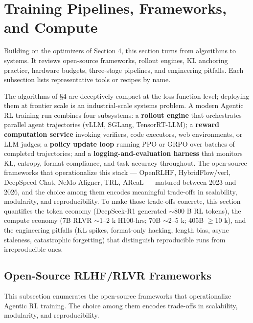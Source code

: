 \documentclass{article}
\begin{document}
\section{Training Pipelines, Frameworks, and Compute}\label{training-pipelines-frameworks-and-compute}

Building on the optimizers of Section 4, this section turns from algorithms to systems. It reviews open-source frameworks, rollout engines, KL anchoring practice, hardware budgets, three-stage pipelines, and engineering pitfalls. Each subsection lists representative tools or recipes by name.

The algorithms of §4 are deceptively compact at the loss-function level; deploying them at frontier scale is an industrial-scale systems problem. A modern Agentic RL training run combines four subsystems: a \textbf{rollout engine} that orchestrates parallel agent trajectories (vLLM, SGLang, TensorRT-LLM); a \textbf{reward computation service} invoking verifiers, code executors, web environments, or LLM judges; a \textbf{policy update loop} running PPO or GRPO over batches of completed trajectories; and a \textbf{logging-and-evaluation harness} that monitors KL, entropy, format compliance, and task accuracy throughout. The open-source frameworks that operationalize this stack --- OpenRLHF, HybridFlow/verl, DeepSpeed-Chat, NeMo-Aligner, TRL, AReaL --- matured between 2023 and 2026, and the choice among them encodes meaningful trade-offs in scalability, modularity, and reproducibility. To make those trade-offs concrete, this section quantifies the token economy (DeepSeek-R1 generated \(\sim 800\) B RL tokens), the compute economy (7B RLVR $\sim$1--2 k H100-hrs; 70B $\sim$2--5 k; 405B $\geq$10 k), and the engineering pitfalls (KL spikes, format-only hacking, length bias, async staleness, catastrophic forgetting) that distinguish reproducible runs from irreproducible ones.

\subsection{Open-Source RLHF/RLVR Frameworks}\label{open-source-rlhfrlvr-frameworks}

This subsection enumerates the open-source frameworks that operationalize Agentic RL training. The choice among them encodes trade-offs in scalability, modularity, and reproducibility.
\end{document}
